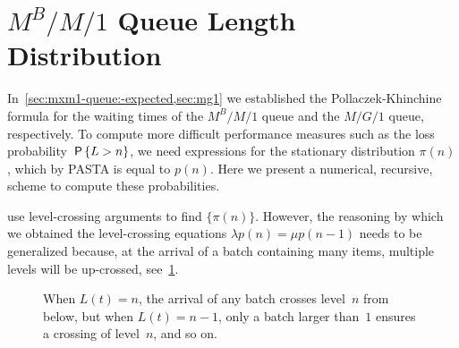 \documentclass[queueing-book.tex]{subfiles}
\begin{document}
\section{\texorpdfstring{$M^B/M/1$}{MBM1} Queue Length Distribution}\label{sec:batch-arrivals}


In~\cref{sec:mxm1-queue:-expected,sec:mg1} we established the Pollaczek-Khinchine formula for the waiting times of the $M^B/M/1$ queue and the $M/G/1$ queue, respectively.
To compute more difficult performance measures such as the loss probability $\,\mathsf{P}\left\{L>n\right\}$, we need expressions for the stationary distribution $\pi(n)$, which by PASTA is equal to $p(n)$.
Here we present a numerical, recursive, scheme to compute these probabilities.


 use level-crossing arguments to find $\{\pi(n)\}$.
However, the reasoning by which we obtained the level-crossing equations $\lambda p(n) = \mu p(n-1)$ needs to be generalized because, at the arrival of a batch containing many items, multiple levels will be up-crossed, see~\cref{fig:levelcrossing}.


\begin{figure}[t]
\centering
{}

\caption{When $L(t)=n$, the arrival of any batch crosses level~$n$ from below, but when $L(t)=n-1$, only a batch larger than~$1$ ensures a crossing of level~$n$, and so on.} \label{fig:levelcrossing}
\end{figure}
\end{document}
